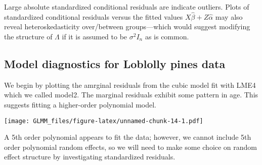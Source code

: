 \documentclass[
]{book}
\newenvironment{Shaded}{\begin{snugshade}}{\end{snugshade}}
\newcommand{\AttributeTok}[1]{\textcolor[rgb]{0.77,0.63,0.00}{#1}}
\newcommand{\FunctionTok}[1]{\textcolor[rgb]{0.00,0.00,0.00}{#1}}
\newcommand{\NormalTok}[1]{#1}
\newcommand{\OtherTok}[1]{\textcolor[rgb]{0.56,0.35,0.01}{#1}}
\newcommand{\SpecialCharTok}[1]{\textcolor[rgb]{0.00,0.00,0.00}{#1}}
\newcommand{\StringTok}[1]{\textcolor[rgb]{0.31,0.60,0.02}{#1}}
\begin{document}
Large absolute standardized conditional residuals are indicate outliers. Plots of standardized conditional residuals versus the fitted values \(X\hat\beta + Z\hat\alpha\) may also reveal heteroskedasticity over/between groups---which would suggest modifying the structure of \(\Lambda\) if it is assumed to be \(\sigma^2 I_n\) as is common.

\hypertarget{model-diagnostics-for-loblolly-pines-data}{%
\subsection{Model diagnostics for Loblolly pines data}\label{model-diagnostics-for-loblolly-pines-data}}

We begin by plotting the amrginal residuals from the cubic model fit with LME4 which we called model2. The marginal residuals exhibit some pattern in age. This suggests fitting a higher-order polynomial model.

\begin{Shaded}
\end{Shaded}

\texttt{[image: GLMM\_files/figure-latex/unnamed-chunk-14-1.pdf]}

A 5th order polynomial appears to fit the data; however, we cannot include 5th order polynomial random effects, so we will need to make some choice on random effect structure by investigating standardized residuals.
\end{document}
